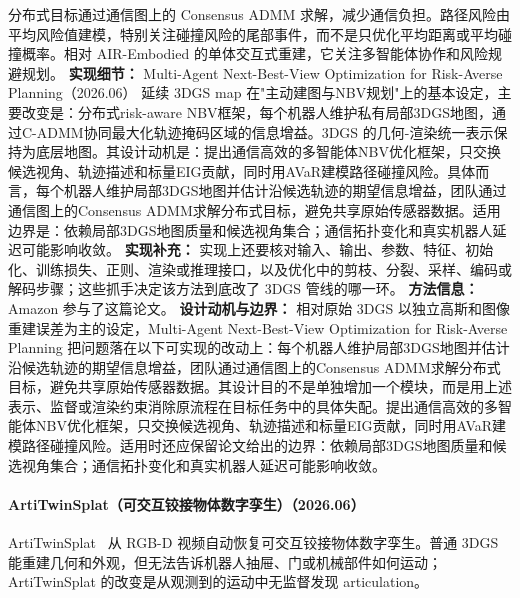 分布式目标通过通信图上的 Consensus ADMM 求解，减少通信负担。路径风险由平均风险值建模，特别关注碰撞风险的尾部事件，而不是只优化平均距离或平均碰撞概率。相对 AIR-Embodied 的单体交互式重建，它关注多智能体协作和风险规避规划。
\textbf{实现细节：} Multi-Agent Next-Best-View Optimization for Risk-Averse Planning（2026.06） 延续 3DGS map 在"主动建图与NBV规划"上的基本设定，主要改变是：分布式risk-aware NBV框架，每个机器人维护私有局部3DGS地图，通过C-ADMM协同最大化轨迹掩码区域的信息增益。3DGS 的几何-渲染统一表示保持为底层地图。其设计动机是：提出通信高效的多智能体NBV优化框架，只交换候选视角、轨迹描述和标量EIG贡献，同时用AVaR建模路径碰撞风险。具体而言，每个机器人维护局部3DGS地图并估计沿候选轨迹的期望信息增益，团队通过通信图上的Consensus ADMM求解分布式目标，避免共享原始传感器数据。适用边界是：依赖局部3DGS地图质量和候选视角集合；通信拓扑变化和真实机器人延迟可能影响收敛。
\textbf{实现补充：} 实现上还要核对输入、输出、参数、特征、初始化、训练损失、正则、渲染或推理接口，以及优化中的剪枝、分裂、采样、编码或解码步骤；这些抓手决定该方法到底改了 3DGS 管线的哪一环。
\textbf{方法信息：} Amazon 参与了这篇论文。
\textbf{设计动机与边界：} 相对原始 3DGS 以独立高斯和图像重建误差为主的设定，Multi-Agent Next-Best-View Optimization for Risk-Averse Planning 把问题落在以下可实现的改动上：每个机器人维护局部3DGS地图并估计沿候选轨迹的期望信息增益，团队通过通信图上的Consensus ADMM求解分布式目标，避免共享原始传感器数据。其设计目的不是单独增加一个模块，而是用上述表示、监督或渲染约束消除原流程在目标任务中的具体失配。提出通信高效的多智能体NBV优化框架，只交换候选视角、轨迹描述和标量EIG贡献，同时用AVaR建模路径碰撞风险。适用时还应保留论文给出的边界：依赖局部3DGS地图质量和候选视角集合；通信拓扑变化和真实机器人延迟可能影响收敛。
\paragraph{ArtiTwinSplat（可交互铰接物体数字孪生）（2026.06）}
ArtiTwinSplat~\cite{2606_24628} 从 RGB-D 视频自动恢复可交互铰接物体数字孪生。普通 3DGS 能重建几何和外观，但无法告诉机器人抽屉、门或机械部件如何运动；ArtiTwinSplat 的改变是从观测到的运动中无监督发现 articulation。

